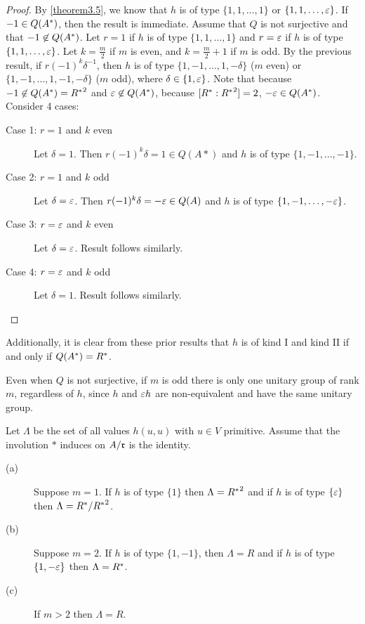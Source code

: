 \begin{proof}
By \cref{theorem3.5}, we know that $h$ is of type $\{1, 1, \dotsc, 1\}$ or $\{1, 1, \dotsc, \varepsilon \}$.
If $-1 \in Q(A^*)$, then the result is immediate.
Assume that $Q$ is not surjective and that $-1 \not\in Q(A^*)$.
Let $r = 1$ if $h$ is of type $\{1, 1, \dotsc, 1\}$ and $r = \varepsilon$ if $h$ is of type $\{1, 1, \dotsc, \varepsilon\}$.
Let $k = \frac{m}{2}$ if $m$ is even, and $k = \frac{m}{2} + 1$ if $m$ is odd.
By the previous result, if $r (-1)^k \delta ^{-1}$, then $h$ is of type $\{1, -1, \dotsc, 1, -\delta\}$ ($m$ even) or $\{1, -1, \dotsc, 1, -1, -\delta \}$ ($m$ odd), where $\delta \in \{1, \varepsilon\}$.
Note that because $-1 \not\in Q(A^*) = {R^*}^2$ and $\varepsilon \not \in Q(A^*)$, because $[R^* : {R^*}^2] = 2$, $-\varepsilon \in Q(A^*)$.
Consider 4 cases:
\begin{description}
\item[Case 1: $r = 1$ and $k$ even] Let $\delta = 1$. Then $r (-1)^k \delta = 1 \in Q(A*)$ and $h$ is of type $\{1, -1, \dotsc, -1 \}$.
\item[Case 2: $r = 1$ and $k$ odd] Let $\delta = \varepsilon$. Then $r (-1)^k \delta = -\varepsilon \in Q(A)$ and $h$ is of type $\{1, -1, \dotsc, -\varepsilon \}$.
\item[Case 3: $r = \varepsilon$ and $k$ even] Let $\delta = \varepsilon$. Result follows similarly.
\item[Case 4: $r = \varepsilon$ and $k$ odd] Let $\delta = 1$. Result follows similarly.
\end{description}
\end{proof}
Additionally, it is clear from these prior results that $h$ is of kind I and kind II if and only if $Q(A^*) = R^*$.

Even when $Q$ is not surjective, if $m$ is odd there is only one unitary group of rank $m$, regardless of $h$, since $h$ and $\varepsilon h$ are non-equivalent and have the same unitary group.

\begin{lemma}\label{lemma3.7}
Let $\Lambda$ be the set of all values $h(u,u)$ with $u \in V$ primitive.
Assume that the involution $*$ induces on $A/\mathfrak{r}$ is the identity.
\begin{description}
\item[(a)] Suppose $m=1$. If $h$ is of type $\{1\}$ then $\Lambda = {R^*}^2$ and if $h$ is of type $\{\varepsilon\}$ then $\Lambda = R^*/{R^*}^2$.
\item[(b)] Suppose $m=2$. If $h$ is of type $\{1, -1\}$, then $\Lambda = R$ and if $h$ is of type $\{1, - \varepsilon\}$ then $\Lambda = R^*$.
\item[(c)] If $m > 2$ then $\Lambda = R$.
\end{description}
\end{lemma}

